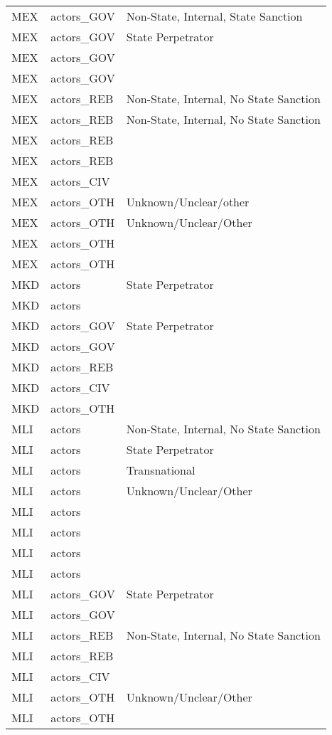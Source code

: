 \begin{table}[ht]
\begin{tabular}{lll}
  MEX & actors\_GOV & Non-State, Internal, State Sanction \\ 
  MEX & actors\_GOV & State Perpetrator \\ 
  MEX & actors\_GOV &  \\ 
  MEX & actors\_GOV &  \\ 
  MEX & actors\_REB & Non-State, Internal, No State Sanction \\ 
  MEX & actors\_REB & Non-State, Internal, No State Sanction \\ 
  MEX & actors\_REB &  \\ 
  MEX & actors\_REB &  \\ 
  MEX & actors\_CIV &  \\ 
  MEX & actors\_OTH & Unknown/Unclear/other \\ 
  MEX & actors\_OTH & Unknown/Unclear/Other \\ 
  MEX & actors\_OTH &  \\ 
  MEX & actors\_OTH &  \\ 
  MKD & actors & State Perpetrator \\ 
  MKD & actors &  \\ 
  MKD & actors\_GOV & State Perpetrator \\ 
  MKD & actors\_GOV &  \\ 
  MKD & actors\_REB &  \\ 
  MKD & actors\_CIV &  \\ 
  MKD & actors\_OTH &  \\ 
  MLI & actors & Non-State, Internal, No State Sanction \\ 
  MLI & actors & State Perpetrator \\ 
  MLI & actors & Transnational \\ 
  MLI & actors & Unknown/Unclear/Other \\ 
  MLI & actors &  \\ 
  MLI & actors &  \\ 
  MLI & actors &  \\ 
  MLI & actors &  \\ 
  MLI & actors\_GOV & State Perpetrator \\ 
  MLI & actors\_GOV &  \\ 
  MLI & actors\_REB & Non-State, Internal, No State Sanction \\ 
  MLI & actors\_REB &  \\ 
  MLI & actors\_CIV &  \\ 
  MLI & actors\_OTH & Unknown/Unclear/Other \\ 
  MLI & actors\_OTH &  \\ 

\end{tabular}
\end{table}
